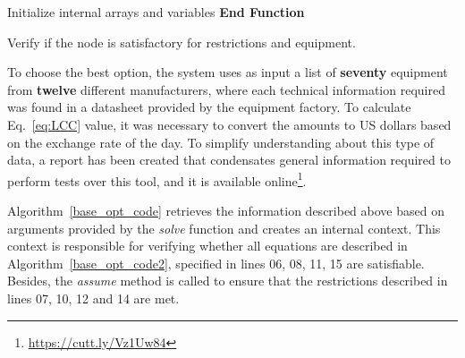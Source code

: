 \documentclass[review]{elsarticle}
\begin{document}
\begin{algorithm}[ht]
\SetAlgoLined
{}
 Initialize internal arrays and variables\;
\textbf{End Function}\;
\caption{Verify if the node is satisfactory for restrictions and equipment.}
\label{base_opt_code2}
\end{algorithm}

To choose the best option, the system uses as input a list of \textbf{seventy} equipment from \textbf{twelve} different manufacturers, where each technical information required was found in a datasheet provided by the equipment factory. To calculate Eq.~\ref{eq:LCC} value, it was necessary to convert the amounts to US dollars based on the exchange rate of the day. To simplify understanding about this type of data, a report has been created that condensates general information required to perform tests over this tool, and it is available online\footnote{\label{note1}\href{https://cutt.ly/Vz1Uw84}{https://cutt.ly/Vz1Uw84}}.


Algorithm~\ref{base_opt_code} retrieves the information described above based on arguments provided by the \textit{solve} function and creates an internal context. This context is responsible for verifying whether all equations are described in Algorithm~\ref{base_opt_code2}, specified in lines 06, 08, 11, 15 are satisfiable. Besides, the \textit{assume} method is called to ensure that the restrictions described in lines 07, 10, 12 and 14 are met.
\end{document}
